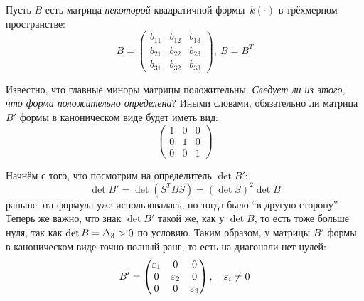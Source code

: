 \documentclass[a4paper,12pt]{article}
\begin{document}
  \begin{example}
    Пусть $B$ есть матрица \emph{некоторой} квадратичной формы~$k(\cdot)$ в трёхмерном пространстве:
    \[
      B = \begin{pmatrix}
        b_{11} & b_{12} & b_{13}\\
        b_{21} & b_{22} & b_{23}\\
        b_{31} & b_{32} & b_{33}
      \end{pmatrix},\ B = B^T
    \]
    
    Известно, что главные миноры матрицы положительны.
    \emph{Следует ли из этого, что форма положительно определена}?
    Иными словами, обязательно ли матрица~$B'$ формы в каноническом виде будет иметь вид:
    \[
      \begin{pmatrix}
        1 & 0 & 0\\
        0 & 1 & 0\\
        0 & 0 & 1
      \end{pmatrix}
    \]

    Начнём с того, что посмотрим на определитель $\det B'$:
    \[
      \det B' = \det (S^T B S) = (\det S)^2 \det B
    \]
    раньше эта формула уже использовалась, но тогда было ``в другую сторону''.
    Теперь же важно, что знак $\det B'$ такой же, как у $\det B$, то есть тоже больше нуля, так как $\det B \hm= \Delta_3 \hm> 0$ по условию.
    Таким образом, у матрицы $B'$ формы в каноническом виде точно полный ранг, то есть на диагонали нет нулей:
    \[
      B' = \begin{pmatrix}
        \varepsilon_1 & 0      & 0\\
        0      & \varepsilon_2 & 0\\
        0      & 0      & \varepsilon_3
      \end{pmatrix},\quad \varepsilon_i \not= 0
    \]
    

\end{example}
\end{document}
